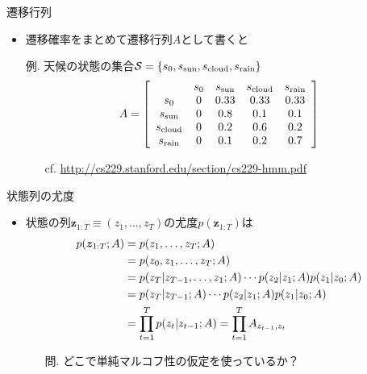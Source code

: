 \documentclass[aspectratio=169,unicode,dvipdfmx,14pt]{beamer}
\begin{document}
\begin{frame}{遷移行列}
\begin{itemize}
\item 遷移確率をまとめて遷移行列$A$として書くと
\item[例.] 天候の状態の集合$\mathcal{S} = \{ s_0, s_{\mbox{\scriptsize sun}},
s_{\mbox{\scriptsize cloud}}, s_{\mbox{\scriptsize rain}} \}$
\begin{align}
A = \left[
    \begin{array}{ccccc}
 & s_0 & s_{\mbox{\scriptsize sun}} & s_{\mbox{\scriptsize cloud}} & s_{\mbox{\scriptsize rain}} \\
s_0 & 0 & 0.33 & 0.33 & 0.33 \\
s_{\mbox{\scriptsize sun}} & 0 & 0.8 & 0.1 & 0.1 \\
s_{\mbox{\scriptsize cloud}} & 0 & 0.2 & 0.6 & 0.2 \\
s_{\mbox{\scriptsize rain}} & 0 & 0.1 & 0.2 & 0.7
    \end{array}
  \right]
\end{align}
\vspace{-.1in}
\begin{itemize}
\item[cf.] \href{http://cs229.stanford.edu/section/cs229-hmm.pdf}{http://cs229.stanford.edu/section/cs229-hmm.pdf}
\end{itemize}
\end{itemize}
\end{frame}

\begin{frame}{状態列の尤度}
\begin{itemize}
\item 状態の列$\bm{z}_{1:T}\equiv(z_1,\ldots,z_T)$の尤度$p(\bm{z}_{1:T})$は
\begin{align}
p(\bm{z}_{1:T};A) & = p(z_1,\ldots,z_T;A) \notag \\
& = p(z_0, z_1,\ldots,z_T;A) \notag \\
& = p(z_T | z_{T-1},\ldots,z_1;A) \cdots p(z_2|z_1;A) p(z_1|z_0;A) \notag \\
& = p(z_T | z_{T-1};A) \cdots p(z_2|z_1;A) p(z_1|z_0;A) \notag \\
& = \prod_{t=1}^T p(z_t | z_{t-1};A) = \prod_{t=1}^T A_{z_{t-1}, z_t}
\label{eq:seq_LH}
\end{align}
\vspace{-.1in}
\begin{itemize}
\item[問.] どこで単純マルコフ性の仮定を使っているか？
\end{itemize}
\end{itemize}
\end{frame}
\end{document}
